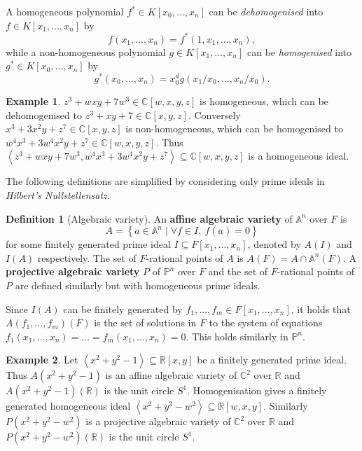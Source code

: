 \documentclass{article}
\newcommand{\R}{\mathbb{R}}
\newcommand{\C}{\mathbb{C}}
\newcommand{\A}{\mathbb{A}}
\renewcommand{\P}{\mathbb{P}}
\newcommand{\rb}[1]{\left( #1 \right)}
\renewcommand{\sb}[1]{\left[ #1 \right]}
\newcommand{\cb}[1]{\left\{ #1 \right\}}
\newcommand{\ab}[1]{\left\langle #1 \right\rangle}
\theoremstyle{definition}
\newtheorem*{definition}{Definition}
\newtheorem*{example}{Example}
\begin{document}
A homogeneous polynomial $ f^* \in K\sb{x_0, \dots, x_n} $ can be \emph{dehomogenised} into $ f \in K\sb{x_1, \dots, x_n} $ by
$$ f\rb{x_1, \dots, x_n} = f^*\rb{1, x_1, \dots, x_n}, $$
while a non-homogeneous polynomial $ g \in K\sb{x_1, \dots, x_n} $ can be \emph{homogenised} into $ g^* \in K\sb{x_0, \dots, x_n} $ by
$$ g^*\rb{x_0, \dots, x_n} = x_0^d g\rb{x_1 / x_0, \dots, x_n / x_0}. $$

\begin{example}
$ z^3 + wxy + 7w^3 \in \C\sb{w, x, y, z} $ is homogeneous, which can be dehomogenised to $ z^3 + xy + 7 \in \C\sb{x, y, z} $. Conversely $ x^3 + 3x^2y + z^7 \in \C\sb{x, y, z} $ is non-homogeneous, which can be homogenised to $ w^4x^3 + 3w^4x^2y + z^7 \in \C\sb{w, x, y, z} $. Thus $ \ab{z^3 + wxy + 7w^3, w^4x^3 + 3w^4x^2y + z^7} \subseteq \C\sb{w, x, y, z} $ is a homogeneous ideal.
\end{example}

The following definitions are simplified by considering only prime ideals in \emph{Hilbert's Nullstellensatz}.

\begin{definition}[Algebraic variety]
An \textbf{affine algebraic variety} of $ \A^n $ over $ F $ is
$$ A = \cb{a \in \A^n \mid \forall f \in I, \ f\rb{a} = 0} $$
for some finitely generated prime ideal $ I \subseteq F\sb{x_1, \dots, x_n} $, denoted by $ A\rb{I} $ and $ I\rb{A} $ respectively. The set of $ F $-rational points of $ A $ is $ A\rb{F} = A \cap \A^n\rb{F} $. A \textbf{projective algebraic variety} $ P $ of $ \P^n $ over $ F $ and the set of $ F $-rational points of $ P $ are defined similarly but with homogeneous prime ideals.
\end{definition}

Since $ I\rb{A} $ can be finitely generated by $ f_1, \dots, f_m \in F\sb{x_1, \dots, x_n} $, it holds that $ A\rb{f_1, \dots, f_m}\rb{F} $ is the set of solutions in $ F $ to the system of equations $ f_1\rb{x_1, \dots, x_n} = \dots = f_m\rb{x_1, \dots, x_n} = 0 $. This holds similarly in $ \P^n $.

\begin{example}
Let $ \ab{x^2 + y^2 - 1} \subseteq \R\sb{x, y} $ be a finitely generated prime ideal. Thus $ A\rb{x^2 + y^2 - 1} $ is an affine algebraic variety of $ \C^2 $ over $ \R $ and $ A\rb{x^2 + y^2 - 1}\rb{\R} $ is the unit circle $ S^1 $. Homogenisation gives a finitely generated homogeneous ideal $ \ab{x^2 + y^2 - w^2} \subseteq \R\sb{w, x, y} $. Similarly $ P\rb{x^2 + y^2 - w^2} $ is a projective algebraic variety of $ \C^2 $ over $ \R $ and $ P\rb{x^2 + y^2 - w^2}\rb{\R} $ is the unit circle $ S^1 $.
\end{example}
\end{document}
